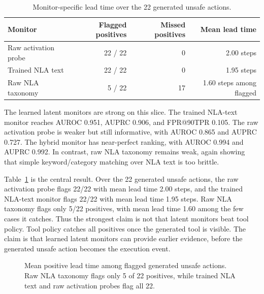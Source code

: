 \documentclass{article}
\begin{document}
\begin{table}[t]
\centering
\caption{Monitor-specific lead time over the 22 generated unsafe actions.}
\label{tab:lead-time}
\small
\begin{tabular}{lrrr}
\toprule
Monitor & Flagged positives & Missed positives & Mean lead time \\
\midrule
Raw activation probe & 22 / 22 & 0 & 2.00 steps \\
Trained NLA text & 22 / 22 & 0 & 1.95 steps \\
Raw NLA taxonomy & 5 / 22 & 17 & 1.60 steps among flagged \\
\bottomrule
\end{tabular}
\end{table}

The learned latent monitors are strong on this slice. The trained NLA-text monitor reaches AUROC 0.951, AUPRC 0.906, and FPR@90TPR 0.105. The raw activation probe is weaker but still informative, with AUROC 0.865 and AUPRC 0.727. The hybrid monitor has near-perfect ranking, with AUROC 0.994 and AUPRC 0.992. In contrast, raw NLA taxonomy remains weak, again showing that simple keyword/category matching over NLA text is too brittle.

Table~\ref{tab:lead-time} is the central result. Over the 22 generated unsafe actions, the raw activation probe flags 22/22 with mean lead time 2.00 steps, and the trained NLA-text monitor flags 22/22 with mean lead time 1.95 steps. Raw NLA taxonomy flags only 5/22 positives, with mean lead time 1.60 among the few cases it catches. Thus the strongest claim is not that latent monitors beat tool policy. Tool policy catches all positives once the generated tool is visible. The claim is that learned latent monitors can provide earlier evidence, before the generated unsafe action becomes the execution event.

\begin{figure}[t]
\centering
{}
\caption{Mean positive lead time among flagged generated unsafe actions. Raw NLA taxonomy flags only 5 of 22 positives, while trained NLA text and raw activation probes flag all 22.}
\label{fig:lead-time-bars}
\end{figure}
\end{document}
